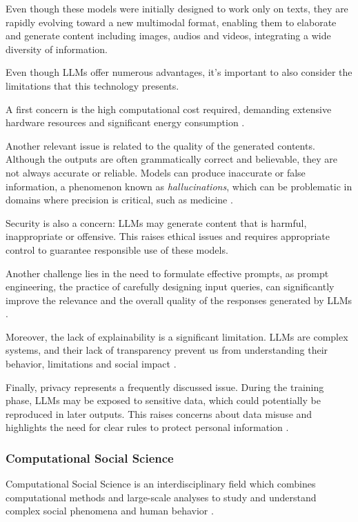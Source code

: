 \medskip
Even though these models were initially designed to work only on texts, they are rapidly evolving toward a new multimodal format, enabling them to elaborate and generate content including images, audios and videos, integrating a wide diversity of information.


\medskip
Even though LLMs offer numerous advantages, it's important to also consider the limitations that this technology presents.

A first concern is the high computational cost required, demanding extensive hardware resources and significant energy consumption \cite{wang2025llm}.

Another relevant issue is related to the quality of the generated contents. Although the outputs are often grammatically correct and believable, they are not always accurate or reliable. Models can produce inaccurate or false information, a phenomenon known as \textit{hallucinations}, which can be problematic in domains where precision is critical, such as medicine \cite{wang2025llm, huang2025hallucination}.

Security is also a concern: LLMs may generate content that is harmful, inappropriate or offensive. This raises ethical issues and requires appropriate control to guarantee responsible use of these models.

Another challenge lies in the need to formulate effective prompts, as prompt engineering, the practice of carefully designing input queries, can significantly improve the relevance and the overall quality of the responses generated by LLMs \cite{shenoy2024prompt}.

Moreover, the lack of explainability is a significant limitation. LLMs are complex systems, and their lack of transparency prevent us from understanding their behavior, limitations and social impact \cite{zhao2024explainability}.

Finally, privacy represents a frequently discussed issue. During the training phase, LLMs may be exposed to sensitive data, which could potentially be reproduced in later outputs. This raises concerns about data misuse and highlights the need for clear rules to protect personal information \cite{wang2025llm}.


\subsubsection{Computational Social Science}
Computational Social Science \cite{lazer2009computational} is an interdisciplinary field which combines computational methods and large-scale analyses to study and understand complex social phenomena and human behavior \cite{conte2012manifesto, thapa2025llm}.

